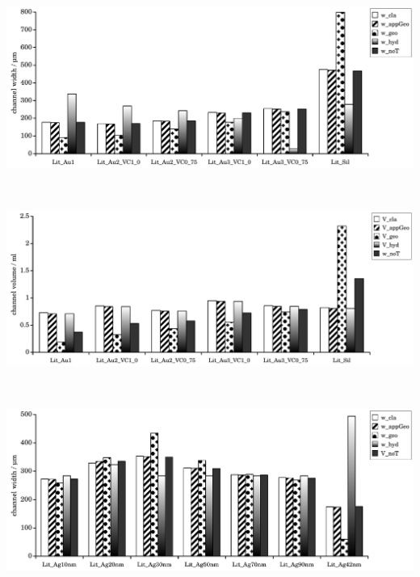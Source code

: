 \begin{minipage}{\linewidth}
\centering
    \begin{minipage}{.75\linewidth}
      \includegraphics[width=\linewidth]{./images/data/eval_lit_p8/Lit1Data_w_8p.pdf}
    \end{minipage}\\
    \begin{minipage}{.75\linewidth}
      \includegraphics[width=\linewidth]{./images/data/eval_lit_p8/Lit1Data_V_8p.pdf}
    \end{minipage}\\
    \begin{minipage}{.75\linewidth}
      \includegraphics[width=\linewidth]{./images/data/eval_lit_p8/Lit2Data_w_8p.pdf}

\end{minipage}
\end{minipage}
